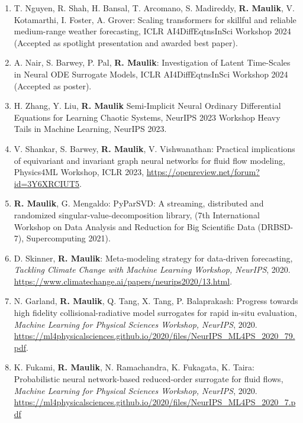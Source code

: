 \documentclass[letterpaper]{article}
\begin{document}
\begin{enumerate}
\item T. Nguyen, R. Shah, H. Bansal, T. Arcomano, S. Madireddy, \textbf{R. Maulik}, V. Kotamarthi, I. Foster, A. Grover: Scaling transformers for skillful and reliable medium-range weather forecasting, ICLR AI4DiffEqtnsInSci Workshop 2024 (Accepted as spotlight presentation and awarded best paper).

\item A. Nair, S. Barwey, P. Pal, \textbf{R. Maulik}: Investigation of Latent Time-Scales in Neural ODE Surrogate Models, ICLR AI4DiffEqtnsInSci Workshop 2024 (Accepted as poster).

\item H. Zhang, Y. Liu, \textbf{R. Maulik} Semi-Implicit Neural Ordinary Differential Equations for Learning Chaotic Systems, NeurIPS 2023 Workshop Heavy Tails in Machine Learning, NeurIPS 2023.

\item V. Shankar, S. Barwey, \textbf{R. Maulik}, V. Vishwanathan: Practical implications of equivariant and invariant graph neural networks for fluid flow modeling, Physics4ML Workshop, ICLR 2023, \url{https://openreview.net/forum?id=3Y6XRCIUT5}.

\item \textbf{R. Maulik}, G. Mengaldo: PyParSVD: A streaming, distributed and randomized singular-value-decomposition library, (7th International Workshop on Data Analysis and Reduction for Big Scientific Data (DRBSD-7), Supercomputing 2021).

\item D. Skinner, \textbf{R. Maulik}: Meta-modeling strategy for data-driven forecasting, \textit{Tackling Climate Change with Machine Learning Workshop, NeurIPS}, 2020. \url{https://www.climatechange.ai/papers/neurips2020/13.html}. 

\item N. Garland, \textbf{R. Maulik}, Q. Tang, X. Tang, P. Balaprakash: Progress towards high fidelity collisional-radiative model surrogates for rapid in-situ evaluation, \textit{Machine Learning for Physical Sciences Workshop, NeurIPS}, 2020. \url{https://ml4physicalsciences.github.io/2020/files/NeurIPS_ML4PS_2020_79.pdf}.

\item K. Fukami, \textbf{R. Maulik}, N. Ramachandra, K. Fukagata, K. Taira: Probabilistic neural network-based reduced-order surrogate for fluid flows, \textit{Machine Learning for Physical Sciences Workshop, NeurIPS}, 2020. \url{https://ml4physicalsciences.github.io/2020/files/NeurIPS_ML4PS_2020_7.pdf}


\end{enumerate}
\end{document}
